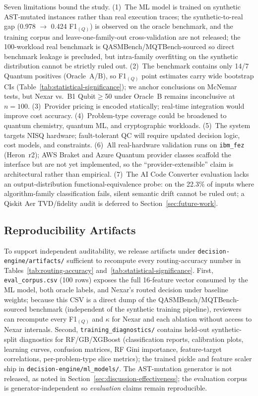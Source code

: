 \documentclass[10pt,conference]{IEEEtran}
\begin{document}
Seven limitations bound the study. (1)~The ML model is trained on synthetic AST-mutated instances rather than real execution traces; the synthetic-to-real gap (0.978 $\rightarrow$ 0.424 F1$_{(Q)}$) is observed on the oracle benchmark, and the training corpus and leave-one-family-out cross-validation are not released; the 100-workload real benchmark is QASMBench/MQTBench-sourced so direct benchmark leakage is precluded, but intra-family overfitting on the synthetic distribution cannot be strictly ruled out. (2)~The benchmark contains only 14/7 Quantum positives (Oracle~A/B), so F1$_{(Q)}$ point estimates carry wide bootstrap CIs (Table~\ref{tab:statistical-significance}); we anchor conclusions on McNemar tests, but Nexar vs.\ B1 Qubit$\geq$50 under Oracle~B remains inconclusive at $n{=}100$. (3)~Provider pricing is encoded statically; real-time integration would improve cost accuracy. (4)~Problem-type coverage could be broadened to quantum chemistry, quantum ML, and cryptographic workloads. (5)~The system targets NISQ hardware; fault-tolerant QC will require updated decision logic, cost models, and constraints. (6)~All real-hardware validation runs on \texttt{ibm\_fez} (Heron~r2); AWS Braket and Azure Quantum provider classes scaffold the interface but are not yet implemented, so the ``provider-extensible'' claim is architectural rather than empirical. (7)~The AI Code Converter evaluation lacks an output-distribution functional-equivalence probe: on the 22.3\% of inputs where algorithm-family classification fails, silent semantic drift cannot be ruled out; a Qiskit Aer TVD/fidelity audit is deferred to Section~\ref{sec:future-work}.

\subsection{Reproducibility Artifacts}\label{sec:reproducibility}

To support independent auditability, we release artifacts under \texttt{decision-engine/artifacts/} sufficient to recompute every routing-accuracy number in Tables~\ref{tab:routing-accuracy} and~\ref{tab:statistical-significance}. First, \texttt{eval\_corpus.csv} (100 rows) exposes the full 16-feature vector consumed by the ML model, both oracle labels, and Nexar's routed decision under baseline weights; because this CSV is a direct dump of the QASMBench/MQTBench-sourced benchmark (independent of the synthetic training pipeline), reviewers can recompute every F1$_{(Q)}$ and $\kappa$ for Nexar and each ablation without access to Nexar internals. Second, \texttt{training\_diagnostics/} contains held-out synthetic-split diagnostics for RF/GB/XGBoost (classification reports, calibration plots, learning curves, confusion matrices, RF Gini importance, feature-target correlations, per-problem-type slice metrics); the trained pickle and feature scaler ship in \texttt{decision-engine/ml\_models/}. The AST-mutation generator is not released, as noted in Section~\ref{sec:discussion-effectiveness}; the evaluation corpus is generator-independent so \emph{evaluation} claims remain reproducible.
\end{document}

